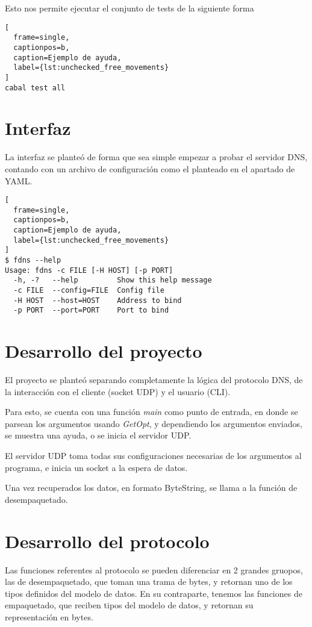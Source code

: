 \documentclass[6pt]{article}
\begin{document}
Esto nos permite ejecutar el conjunto de tests de la siguiente forma

\begin{lstlisting}[
  frame=single,
  captionpos=b,
  caption=Ejemplo de ayuda,
  label={lst:unchecked_free_movements}
]
cabal test all
\end{lstlisting}


\section{Interfaz}

La interfaz se planteó de forma que sea simple empezar a probar el
servidor DNS, contando con un archivo de configuración como el
planteado en el apartado de YAML.

\begin{lstlisting}[
  frame=single,
  captionpos=b,
  caption=Ejemplo de ayuda,
  label={lst:unchecked_free_movements}
]
$ fdns --help
Usage: fdns -c FILE [-H HOST] [-p PORT]
  -h, -?   --help         Show this help message
  -c FILE  --config=FILE  Config file
  -H HOST  --host=HOST    Address to bind
  -p PORT  --port=PORT    Port to bind
\end{lstlisting}

\section{Desarrollo del proyecto}

El proyecto se planteó separando completamente la lógica del protocolo
DNS, de la interacción con el cliente (socket UDP) y el usuario (CLI).

Para esto, se cuenta con una función \textit{main} como punto de entrada,
en donde se parsean los argumentos usando \textit{GetOpt}, y dependiendo
los argumentos enviados, se muestra una ayuda, o se inicia el servidor
UDP.

El servidor UDP toma todas sus configuraciones necesarias de los
argumentos al programa, e inicia un socket a la espera de datos.

Una vez recuperados los datos, en formato ByteString, se llama a la
función de desempaquetado.

\section{Desarrollo del protocolo}

Las funciones referentes al protocolo se pueden diferenciar en 2 grandes
gruopos, las de desempaquetado, que toman una trama de bytes, y retornan
uno de los tipos definidos del modelo de datos. En su contraparte, tenemos
las funciones de empaquetado, que reciben tipos del modelo de datos, y
retornan su representación en bytes.
\end{document}

